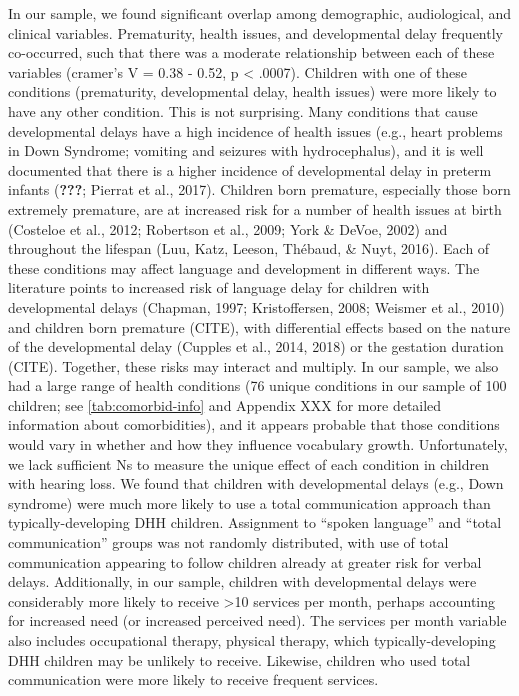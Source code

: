 \documentclass[english,man]{apa6}
\begin{document}
In our sample, we found significant overlap among demographic, audiological, and clinical variables. Prematurity, health issues, and developmental delay frequently co-occurred, such that there was a moderate relationship between each of these variables (cramer's V = 0.38 - 0.52, p \textless{} .0007). Children with one of these conditions (prematurity, developmental delay, health issues) were more likely to have any other condition. This is not surprising. Many conditions that cause developmental delays have a high incidence of health issues (e.g., heart problems in Down Syndrome; vomiting and seizures with hydrocephalus), and it is well documented that there is a higher incidence of developmental delay in preterm infants ({\textbf{???}}; Pierrat et al., 2017). Children born premature, especially those born extremely premature, are at increased risk for a number of health issues at birth (Costeloe et al., 2012; Robertson et al., 2009; York \& DeVoe, 2002) and throughout the lifespan (Luu, Katz, Leeson, Thébaud, \& Nuyt, 2016).
Each of these conditions may affect language and development in different ways. The literature points to increased risk of language delay for children with developmental delays (Chapman, 1997; Kristoffersen, 2008; Weismer et al., 2010) and children born premature (CITE), with differential effects based on the nature of the developmental delay (Cupples et al., 2014, 2018) or the gestation duration (CITE). Together, these risks may interact and multiply. In our sample, we also had a large range of health conditions (76 unique conditions in our sample of 100 children; see \ref{tab:comorbid-info} and Appendix XXX for more detailed information about comorbidities), and it appears probable that those conditions would vary in whether and how they influence vocabulary growth. Unfortunately, we lack sufficient Ns to measure the unique effect of each condition in children with hearing loss.
We found that children with developmental delays (e.g., Down syndrome) were much more likely to use a total communication approach than typically-developing DHH children. Assignment to \enquote{spoken language} and \enquote{total communication} groups was not randomly distributed, with use of total communication appearing to follow children already at greater risk for verbal delays. Additionally, in our sample, children with developmental delays were considerably more likely to receive \textgreater{}10 services per month, perhaps accounting for increased need (or increased perceived need). The services per month variable also includes occupational therapy, physical therapy, which typically-developing DHH children may be unlikely to receive. Likewise, children who used total communication were more likely to receive frequent services.
\end{document}
